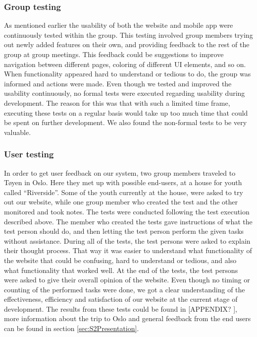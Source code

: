 \subsubsection{Group testing}
As mentioned earlier the usability of both the website and mobile app were continuously tested within the group. This testing involved group members trying out newly added features on their own, and providing feedback to the rest of the group at group meetings. This feedback could be suggestions to improve navigation between different pages, coloring of different UI elements, and so on. When functionality appeared hard to understand or tedious to do, the group was informed and actions were made. Even though we tested and improved the usability continuously, no formal tests were executed regarding usability during development. The reason for this was that with such a limited time frame, executing these tests on a regular basis would take up too much time that could be spent on further development. We also found the non-formal tests to be very valuable.

\subsubsection{User testing}
In order to get user feedback on our system, two group members traveled to T{\o}yen in Oslo. Here they met up with possible end-users, at a house for youth called “Riverside”. Some of the youth currently at the house, were asked to try out our website, while one group member who created the test and the other monitored and took notes. The tests were conducted following the test execution described above. The member who created the tests gave instructions of what the test person should do, and then letting the test person perform the given tasks without assistance. During all of the tests, the test persons were asked to explain their thought process. That way it was easier to understand what functionality of the website that could be confusing, hard to understand or tedious, and also what functionality that worked well. At the end of the tests, the test persons were asked to give their overall opinion of the website. Even though no timing or counting of the performed tasks were done, we got a clear understanding of the effectiveness, efficiency and satisfaction of our website at the current stage of development. The results from these tests could be found in [APPENDIX? ], more information about the trip to Oslo and general feedback from the end users can be found in section \ref{sec:S2Presentation}.